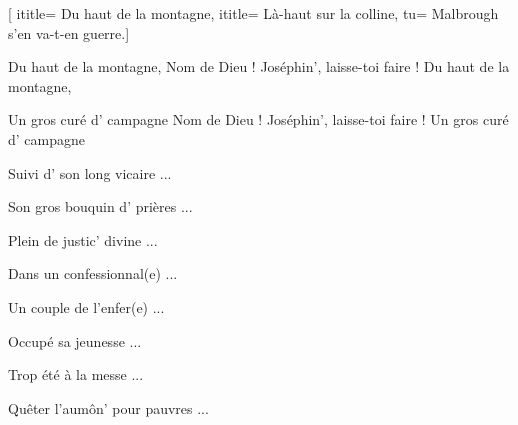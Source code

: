  [
ititle= {Du haut de la montagne},
ititle= {Là-haut sur la colline},
tu= {Malbrough s'en va-t-en guerre.}]


\beginverse
Du haut de la montagne,
Nom de Dieu ! Joséphin', laisse-toi faire !
Du haut de la montagne,
\endverse

\beginverse
Un gros curé d' campagne
Nom de Dieu ! Joséphin', laisse-toi faire !
Un gros curé d' campagne
\endverse

\beginverse
Suivi d' son long vicaire ...
\endverse

\beginverse
Son gros bouquin d' prières ...
\endverse

\beginverse
Plein de justic' divine ...
\endverse

\beginverse
Dans un confessionnal(e) ...
\endverse

\beginverse
Un couple de l'enfer(e) ...
\endverse

\beginverse
Occupé sa jeunesse ...
\endverse

\beginverse
Trop été à la messe ...
\endverse

\beginverse
Quêter l'aumôn' pour pauvres ...
\endverse
\endsong
